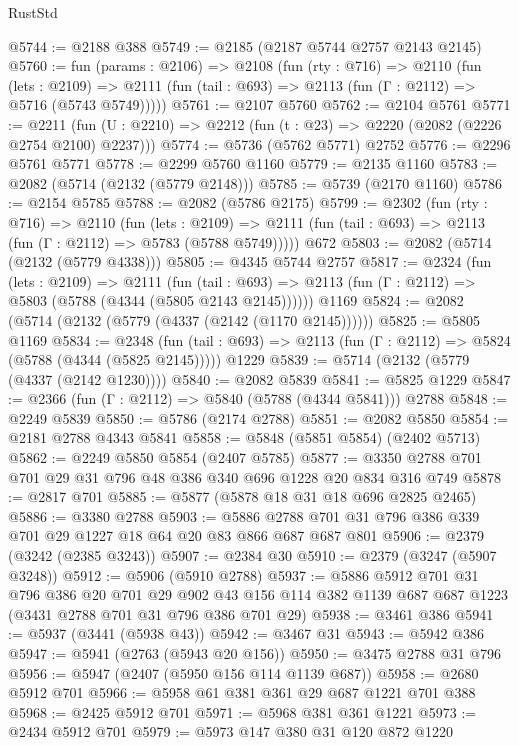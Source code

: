 \begin{lexlean}{RustStd}
\begin{coremodule}
@5744 := @2188 @388
@5749 := @2185 (@2187 @5744 @2757 @2143 @2145)
@5760 := fun (params : @2106) =>
  @2108
    (fun (rty : @716) =>
    @2110
      (fun (lets : @2109) =>
      @2111 (fun (tail : @693) => @2113 (fun (Γ : @2112) => @5716 (@5743 @5749)))))
@5761 := @2107 @5760
@5762 := @2104 @5761
@5771 := @2211 (fun (U : @2210) => @2212 (fun (t : @23) => @2220 (@2082 (@2226 @2754 @2100) @2237)))
@5774 := @5736 (@5762 @5771) @2752
@5776 := @2296 @5761 @5771
@5778 := @2299 @5760 @1160
@5779 := @2135 @1160
@5783 := @2082 (@5714 (@2132 (@5779 @2148)))
@5785 := @5739 (@2170 @1160)
@5786 := @2154 @5785
@5788 := @2082 (@5786 @2175)
@5799 := @2302
    (fun (rty : @716) =>
    @2110
      (fun (lets : @2109) =>
      @2111 (fun (tail : @693) => @2113 (fun (Γ : @2112) => @5783 (@5788 @5749)))))
    @672
@5803 := @2082 (@5714 (@2132 (@5779 @4338)))
@5805 := @4345 @5744 @2757
@5817 := @2324
    (fun (lets : @2109) =>
    @2111
      (fun (tail : @693) => @2113 (fun (Γ : @2112) => @5803 (@5788 (@4344 (@5805 @2143 @2145))))))
    @1169
@5824 := @2082 (@5714 (@2132 (@5779 (@4337 (@2142 (@1170 @2145))))))
@5825 := @5805 @1169
@5834 := @2348
    (fun (tail : @693) => @2113 (fun (Γ : @2112) => @5824 (@5788 (@4344 (@5825 @2145)))))
    @1229
@5839 := @5714 (@2132 (@5779 (@4337 (@2142 @1230))))
@5840 := @2082 @5839
@5841 := @5825 @1229
@5847 := @2366 (fun (Γ : @2112) => @5840 (@5788 (@4344 @5841))) @2788
@5848 := @2249 @5839
@5850 := @5786 (@2174 @2788)
@5851 := @2082 @5850
@5854 := @2181 @2788 @4343 @5841
@5858 := @5848 (@5851 @5854) (@2402 @5713)
@5862 := @2249 @5850 @5854 (@2407 @5785)
@5877 := @3350 @2788 @701 @701 @29 @31 @796 @48 @386 @340 @696 @1228 @20 @834 @316 @749
@5878 := @2817 @701
@5885 := @5877 (@5878 @18 @31 @18 @696 @2825 @2465)
@5886 := @3380 @2788
@5903 := @5886 @2788 @701 @31 @796 @386 @339 @701 @29 @1227 @18 @64 @20 @83 @866 @687 @687 @801
@5906 := @2379 (@3242 (@2385 @3243))
@5907 := @2384 @30
@5910 := @2379 (@3247 (@5907 @3248))
@5912 := @5906 (@5910 @2788)
@5937 := @5886
    @5912
    @701
    @31
    @796
    @386
    @20
    @701
    @29
    @902
    @43
    @156
    @114
    @382
    @1139
    @687
    @687
    @1223
    (@3431 @2788 @701 @31 @796 @386 @701 @29)
@5938 := @3461 @386
@5941 := @5937 (@3441 (@5938 @43))
@5942 := @3467 @31
@5943 := @5942 @386
@5947 := @5941 (@2763 (@5943 @20 @156))
@5950 := @3475 @2788 @31 @796
@5956 := @5947 (@2407 (@5950 @156 @114 @1139 @687))
@5958 := @2680 @5912 @701
@5966 := @5958 @61 @381 @361 @29 @687 @1221 @701 @388
@5968 := @2425 @5912 @701
@5971 := @5968 @381 @361 @1221
@5973 := @2434 @5912 @701
@5979 := @5973 @147 @380 @31 @120 @872 @1220

\end{coremodule}
\end{lexlean}

